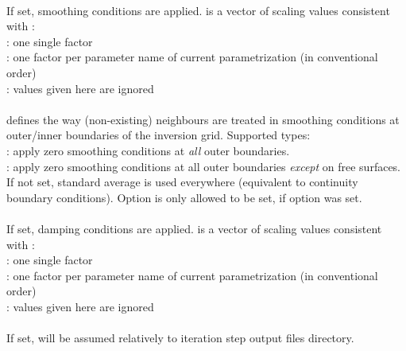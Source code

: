 \paragraph{}
If set, smoothing conditions are applied.  is a vector of scaling values consistent 
with :\\
: one single factor\\
: one factor per parameter name of current parametrization (in conventional order)\\
 : values given here are ignored
\paragraph{}
 defines the way (non-existing) neighbours are treated in smoothing conditions at outer/inner 
boundaries of the inversion grid. Supported types:\\
: apply zero smoothing conditions at \emph{all} outer boundaries.\\
: apply zero smoothing conditions at all outer boundaries \emph{except} on free surfaces. \\
If not set, standard average is used everywhere (equivalent to continuity boundary conditions).
Option  is only allowed to be set, if option  was set.
\paragraph{}
If set, damping conditions are applied.  is a vector of scaling values consistent 
with :\\
: one single factor\\
: one factor per parameter name of current parametrization (in conventional order)\\
 : values given here are ignored
\paragraph{}
If set,  will be assumed relatively to iteration step output files directory.
